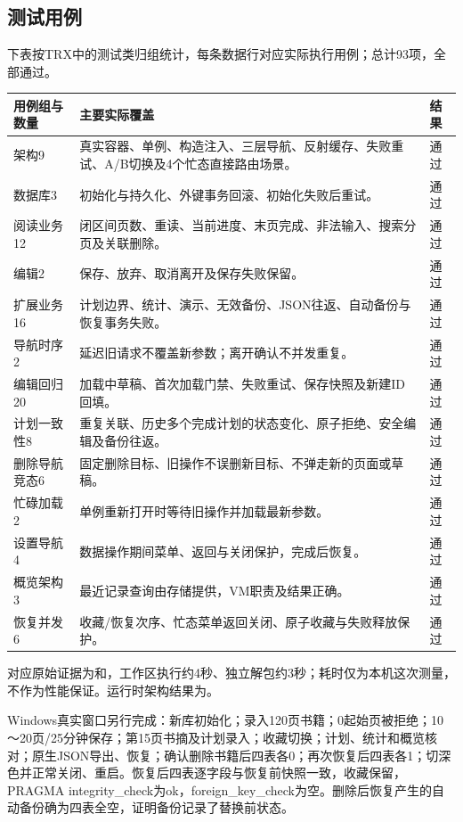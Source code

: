 \documentclass[UTF8,a4paper,11pt,fontset=none]{ctexart}
\begin{document}
\subsection{测试用例}
下表按TRX中的测试类归组统计，每条数据行对应实际执行用例；总计93项，全部通过。
\begin{longtable}{p{36mm}p{88mm}p{15mm}}\toprule 用例组与数量 & 主要实际覆盖 & 结果\\\midrule
架构9 & 真实容器、单例、构造注入、三层导航、反射缓存、失败重试、A/B切换及4个忙态直接路由场景。 & 通过\\
数据库3 & 初始化与持久化、外键事务回滚、初始化失败后重试。 & 通过\\
阅读业务12 & 闭区间页数、重读、当前进度、末页完成、非法输入、搜索分页及关联删除。 & 通过\\
编辑2 & 保存、放弃、取消离开及保存失败保留。 & 通过\\
扩展业务16 & 计划边界、统计、演示、无效备份、JSON往返、自动备份与恢复事务失败。 & 通过\\
导航时序2 & 延迟旧请求不覆盖新参数；离开确认不并发重复。 & 通过\\
编辑回归20 & 加载中草稿、首次加载门禁、失败重试、保存快照及新建ID回填。 & 通过\\
计划一致性8 & 重复关联、历史多个完成计划的状态变化、原子拒绝、安全编辑及备份往返。 & 通过\\
删除导航竞态6 & 固定删除目标、旧操作不误删新目标、不弹走新的页面或草稿。 & 通过\\
忙碌加载2 & 单例重新打开时等待旧操作并加载最新参数。 & 通过\\
设置导航4 & 数据操作期间菜单、返回与关闭保护，完成后恢复。 & 通过\\
概览架构3 & 最近记录查询由存储提供，VM职责及结果正确。 & 通过\\
恢复并发6 & 收藏/恢复次序、忙态菜单返回关闭、原子收藏与失败释放保护。 & 通过\\\bottomrule
\end{longtable}

对应原始证据为和，工作区执行约4秒、独立解包约3秒；耗时仅为本机这次测量，不作为性能保证。运行时架构结果为。

Windows真实窗口另行完成：新库初始化；录入120页书籍；0起始页被拒绝；10～20页/25分钟保存；第15页书摘及计划录入；收藏切换；计划、统计和概览核对；原生JSON导出、恢复；确认删除书籍后四表各0；再次恢复后四表各1；切深色并正常关闭、重启。恢复后四表逐字段与恢复前快照一致，收藏保留，PRAGMA integrity_check为ok，foreign_key_check为空。删除后恢复产生的自动备份确为四表全空，证明备份记录了替换前状态。
\end{document}
